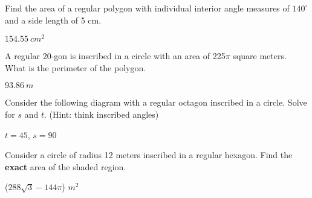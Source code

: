 \begin{exercises}
	\smallskip
	
	\begin{ex} Find the area of a regular polygon with individual interior angle measures of $140^\circ$ and a side length of 5 cm.
	 
	\begin{sol}
	$154.55~cm^2$
	\end{sol}
	\end{ex}
	
	\vfill
	
	\begin{ex} A regular 20-gon is inscribed in a circle with an area of 225$\pi$ square meters.  What is the perimeter of the polygon.
	 
	\begin{sol}
	$93.86~m$
	\end{sol}
	\end{ex}
	
	\vfill
	\newpage
	
	\begin{ex} \e Consider the following diagram with a regular octagon inscribed in a circle.  Solve for $s$ and $t$. (Hint:  think inscribed angles)

\newdimen\R
\R=2.0cm

\begin{center}
\end{center}
	 
	\begin{sol}
	$t=45$, $s=90$
	\end{sol}
	\end{ex}
	
	\medskip
	
	\begin{ex}
	Consider a circle of radius 12 meters inscribed in a regular hexagon.  Find the \textbf{exact} area of the shaded region.

\begin{flushright}\end{flushright}
	\begin{sol}
	($288 \sqrt{3} - 144 \pi$) $m^2$
	\end{sol}
	\end{ex}
	

\end{exercises}
